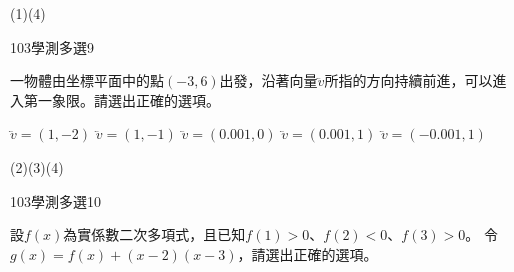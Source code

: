 \begin{QUESTIONS}
\begin{QUESTION}
        \begin{QANS}
            (1)(4)
        \end{QANS}
        \begin{QSOLLIST}
        \end{QSOLLIST}
        \begin{QEMPTYSPACE}
        \end{QEMPTYSPACE}
    \end{QUESTION}
    \begin{QUESTION}
        \begin{ExamInfo}{103}{學測}{多選}{9}
        \end{ExamInfo}
        \begin{ExamAnsRateInfo}{71}{94}{77}{42}
        \end{ExamAnsRateInfo}
        \begin{QBODY}
            一物體由坐標平面中的點$(-3,6)$出發，沿著向量$\lvec{v}$所指的方向持續前進，可以進入第一象限。請選出正確的選項。
			\begin{QOPS}
				\QOP $\lvec{v}=(1,-2)$
				\QOP $\lvec{v}=(1,-1)$
				\QOP $\lvec{v}=(0.001,0)$
				\QOP $\lvec{v}=(0.001,1)$
				\QOP $\lvec{v}=(-0.001,1)$
			\end{QOPS}
        \end{QBODY}
        \begin{QFROMS}
        \end{QFROMS}
        \begin{QTAGS}\end{QTAGS}
        \begin{QANS}
            (2)(3)(4)
        \end{QANS}
        \begin{QSOLLIST}
        \end{QSOLLIST}
        \begin{QEMPTYSPACE}
        \end{QEMPTYSPACE}
    \end{QUESTION}
    \begin{QUESTION}
        \begin{ExamInfo}{103}{學測}{多選}{10}
        \end{ExamInfo}
        \begin{ExamAnsRateInfo}{53}{83}{52}{24}
        \end{ExamAnsRateInfo}
        \begin{QBODY}
            設$f(x)$為實係數二次多項式，且已知$f(1)>0$、$f(2)<0$、$f(3)>0$。
		令$g(x)=f(x)+(x-2)(x-3)$，請選出正確的選項。

\end{QBODY}
\end{QUESTION}
\end{QUESTIONS}
